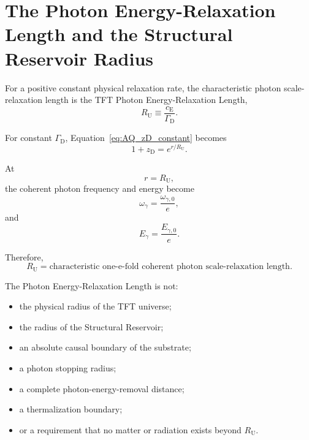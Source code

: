 \section{The Photon Energy-Relaxation Length and the Structural Reservoir Radius}

For a positive constant physical relaxation rate, the characteristic photon
scale-relaxation length is the TFT Photon Energy-Relaxation Length,
\begin{equation}
    \boxed{
    R_{\mathrm U}
    \equiv
    \frac{
        c_{\mathrm E}
    }{
        \Gamma_{\mathrm D}
    }.
    }
    \label{eq:AQ_RU}
\end{equation}

For constant $\Gamma_{\mathrm D}$,
Equation~\eqref{eq:AQ_zD_constant} becomes
\begin{equation}
    1+z_{\mathrm D}
    =
    e^{r/R_{\mathrm U}}.
\end{equation}

At
\begin{equation}
    r=R_{\mathrm U},
\end{equation}
the coherent photon frequency and energy become
\begin{equation}
    \omega_{\gamma}
    =
    \frac{
        \omega_{\gamma,0}
    }{
        e
    },
\end{equation}
and
\begin{equation}
    E_{\gamma}
    =
    \frac{
        E_{\gamma,0}
    }{
        e
    }.
\end{equation}

Therefore,
\begin{equation}
    \boxed{
    R_{\mathrm U}
    =
    \text{characteristic one-e-fold coherent photon scale-relaxation length}.
    }
    \label{eq:AQ_RU_definition}
\end{equation}

The Photon Energy-Relaxation Length is not:

\begin{itemize}
    \item the physical radius of the TFT universe;

    \item the radius of the Structural Reservoir;

    \item an absolute causal boundary of the substrate;

    \item a photon stopping radius;

    \item a complete photon-energy-removal distance;

    \item a thermalization boundary;

    \item or a requirement that no matter or radiation exists beyond
    $R_{\mathrm U}$.
\end{itemize}

